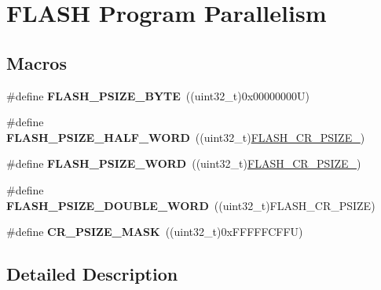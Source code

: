 \hypertarget{group___f_l_a_s_h___program___parallelism}{}\section{F\+L\+A\+SH Program Parallelism}
\label{group___f_l_a_s_h___program___parallelism}
\subsection*{Macros}
\begin{DoxyCompactItemize}
\item 
\mbox{\label{group___f_l_a_s_h___program___parallelism_ga83c67710aa697216193654e1e90cc953}} 
\#define {\bfseries F\+L\+A\+S\+H\+\_\+\+P\+S\+I\+Z\+E\+\_\+\+B\+Y\+TE}~((uint32\+\_\+t)0x00000000\+U)
\item 
\mbox{\label{group___f_l_a_s_h___program___parallelism_gad3210ba7423b45cb3063f4294cdeab16}} 
\#define {\bfseries F\+L\+A\+S\+H\+\_\+\+P\+S\+I\+Z\+E\+\_\+\+H\+A\+L\+F\+\_\+\+W\+O\+RD}~((uint32\+\_\+t)\mbox{\hyperlink{group___peripheral___registers___bits___definition_gaadbc673f47f1ed33ca4144e9eee91ad6}{F\+L\+A\+S\+H\+\_\+\+C\+R\+\_\+\+P\+S\+I\+Z\+E\+\_}})
\item 
\mbox{\label{group___f_l_a_s_h___program___parallelism_gac3ac337ed43efc869a9f734527e44673}} 
\#define {\bfseries F\+L\+A\+S\+H\+\_\+\+P\+S\+I\+Z\+E\+\_\+\+W\+O\+RD}~((uint32\+\_\+t)\mbox{\hyperlink{group___peripheral___registers___bits___definition_ga196dca8b265486bf05782e6bbe81d854}{F\+L\+A\+S\+H\+\_\+\+C\+R\+\_\+\+P\+S\+I\+Z\+E\+\_}})
\item 
\mbox{\label{group___f_l_a_s_h___program___parallelism_ga0fd17c4e281f199f09a6a6365e9243ee}} 
\#define {\bfseries F\+L\+A\+S\+H\+\_\+\+P\+S\+I\+Z\+E\+\_\+\+D\+O\+U\+B\+L\+E\+\_\+\+W\+O\+RD}~((uint32\+\_\+t)F\+L\+A\+S\+H\+\_\+\+C\+R\+\_\+\+P\+S\+I\+ZE)
\item 
\mbox{\label{group___f_l_a_s_h___program___parallelism_ga7c755f15e36221021a1438857e40365c}} 
\#define {\bfseries C\+R\+\_\+\+P\+S\+I\+Z\+E\+\_\+\+M\+A\+SK}~((uint32\+\_\+t)0x\+F\+F\+F\+F\+F\+C\+F\+F\+U)
\end{DoxyCompactItemize}


\subsection{Detailed Description}
